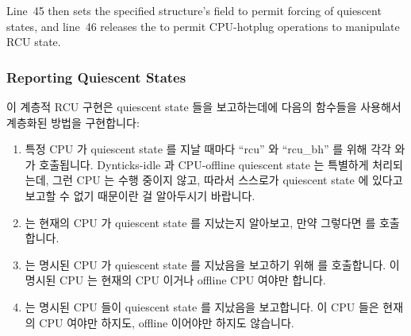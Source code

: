 Line~45 then sets the specified  structure's 
field to permit forcing of quiescent states, and
line~46 releases the  to permit CPU-hotplug
operations to manipulate RCU state.
\fi

\subsubsection{Reporting Quiescent States}
\label{app:rcuimpl:rcutreewt:Reporting Quiescent States}

이 계층적 RCU 구현은 quiescent state 들을 보고하는데에 다음의 함수들을 사용해서
계층화된 방법을 구현합니다:
\iffalse

This hierarchical RCU implementation implements a layered approach
to reporting quiescent states, using the following functions:
\fi
\begin{enumerate}
\item	특정 CPU 가 quiescent state 를 지날 때마다 ``rcu'' 와 ``rcu\_bh'' 를
	위해 각각  와  가
	호출됩니다.
	Dynticks-idle 과 CPU-offline quiescent state 는 특별하게 처리되는데,
	그런 CPU 는 수행 중이지 않고, 따라서 스스로가 quiescent state 에 있다고
	보고할 수 없기 때문이란 걸 알아두시기 바랍니다.
\iffalse

\item	\co{rcu_qsctr_inc()} and \co{rcu_bh_qsctr_inc()}
	are invoked when a given CPU passes through a
	quiescent state for ``rcu'' and ``rcu\_bh'', respectively.
	Note that the dynticks-idle and CPU-offline quiescent states
	are handled specially, due to the fact that such a CPU
	is not executing, and thus is unable to report itself as
	being in a quiescent state.
\fi
\item	{} 는 현재의 CPU 가 quiescent state 를
	지났는지 알아보고, 만약 그렇다면  를 호출합니다.
\item	{} 는 명시된 CPU 가 quiescent state 를 지났음을 보고하기
	위해  를 호출합니다.
	이 명시된 CPU 는 현재의 CPU 이거나 offline CPU 여야만 합니다.
\item	{} 는 명시된 CPU 들이 quiescent state 를 지났음을
	보고합니다.  이 CPU 들은 현재의 CPU 여야만 하지도, offline 이어야만
	하지도 않습니다.
\iffalse

\item	\co{rcu_check_quiescent_state()} checks to see if the current
	CPU has passed through a quiescent state, invoking \co{cpu_quiet()}
	if so.
\item	\co{cpu_quiet()} reports the specified CPU as having passed
	through a quiescent state by invoking \co{cpu_quiet_msk()}.
	The specified CPU must either be the current CPU or an offline CPU.
\item	\co{cpu_quiet_msk()} reports the specified vector of CPUs as
	having passed through a quiescent state.  The CPUs in the
	vector need not be the current CPU, nor must they be offline.
\fi
\end{enumerate}

